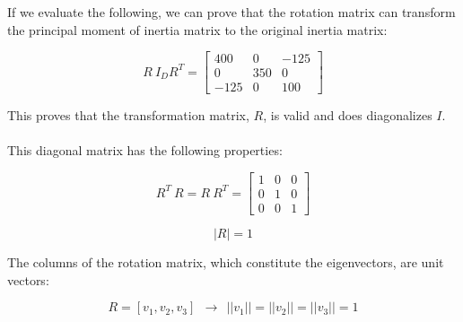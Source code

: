 \documentclass[12pt, letterpaper]{../assignment}
\begin{document}
If we evaluate the following, we can prove that the rotation matrix can transform the principal moment of inertia matrix to the original inertia matrix:

$$ R\ I_D R^T = \left[\begin{array}{ccc} 400 & 0 & -125\\ 0 & 350 & 0\\ -125 & 0 & 100 \end{array}\right] $$

This proves that the transformation matrix, $R$, is valid and does diagonalizes $I$.
\\\\
This diagonal matrix has the following properties:

$$ R^T\ R = R\ R^T = \left[\begin{array}{ccc} 1 & 0 & 0\\ 0 & 1 & 0\\ 0 & 0 & 1 \end{array}\right] $$

$$ \left| R \right| = 1 $$

The columns of the rotation matrix,
which constitute the eigenvectors,
are unit vectors:

$$ R = \left[ v_1 , v_2 , v_3 \right] \ \  \rightarrow \ \ 
 ||v_1|| = ||v_2|| = ||v_3|| = 1 $$
\end{document}
